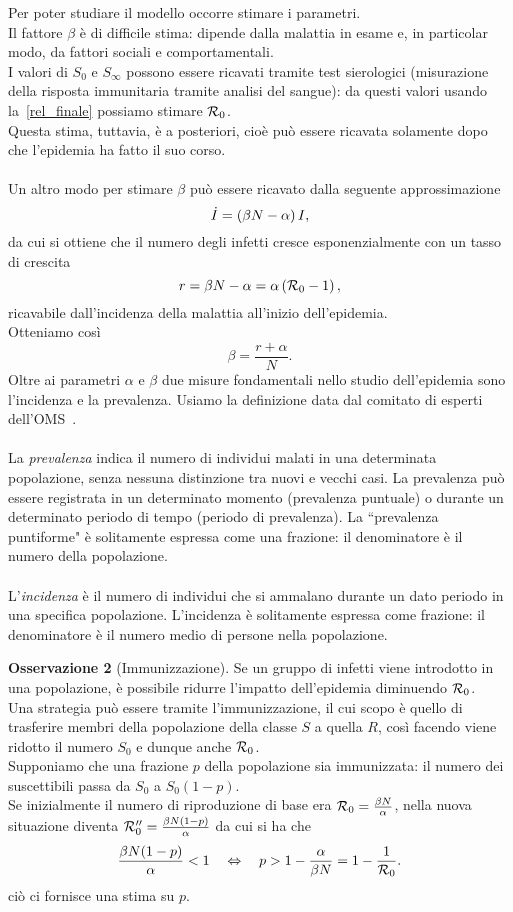 Per poter studiare il modello occorre stimare i parametri.\\ Il fattore $\beta$ \`e di difficile stima: dipende dalla malattia in esame e,  in particolar modo, da fattori sociali e comportamentali.\\
I valori di $S_0$ e $S_\infty$ possono essere ricavati tramite test sierologici (misurazione della risposta immunitaria tramite analisi del sangue): da questi valori usando la~\eqref{rel_finale} possiamo stimare $\mathcal R_0$.\\
Questa stima, tuttavia, \`e a posteriori, cio\`e pu\`o essere ricavata solamente dopo che l'epidemia ha fatto il suo corso.\\ \\
Un altro modo per stimare $\beta$ pu\`o essere ricavato dalla seguente approssimazione
$$ \dot I = \left(  \beta N -\alpha  \right) I,$$ 
da cui si ottiene che il numero degli infetti cresce esponenzialmente con un tasso di crescita 
$$ r =\beta N - \alpha = \alpha \left(  \mathcal R_0 -1 \right),$$
ricavabile dall'incidenza della malattia  all'inizio dell'epidemia.\\Otteniamo cos\`i 
$$ \beta = \frac{r + \alpha } {N}.$$
Oltre ai parametri $\alpha$ e $\beta$ due misure fondamentali nello studio dell'epidemia sono l'incidenza e la prevalenza. Usiamo la definizione data dal comitato di esperti dell'OMS~\cite{world1959expert}.\\ \\ 
La \textit{prevalenza} indica il numero di individui malati in una determinata popolazione, senza nessuna distinzione tra nuovi e vecchi casi. La prevalenza pu\`o essere registrata in un determinato momento (prevalenza puntuale) o durante un determinato periodo di tempo (periodo di prevalenza). La ``prevalenza puntiforme"  \`e solitamente espressa come una frazione: il denominatore \`e il numero della popolazione.\\ \\
L'\textit{incidenza} \`e il numero di  individui che si ammalano durante un dato periodo in una specifica popolazione. L'incidenza \`e solitamente espressa come frazione: il denominatore \`e il numero medio di persone nella popolazione.
\newpage

\textbf{Osservazione 2} (Immunizzazione).
Se un gruppo di infetti viene introdotto in una popolazione,  \`e possibile ridurre l'impatto dell'epidemia diminuendo $\mathcal R_0$.\\
Una strategia pu\`o essere tramite l'immunizzazione, il cui scopo \`e quello di trasferire membri della popolazione della classe $S$ a quella $R$, cos\`i facendo viene ridotto il numero $S_0$ e dunque anche $\mathcal R_0$.\\
Supponiamo che una frazione $p$ della popolazione sia  immunizzata: il numero dei suscettibili passa da $S_0$ a $S_0(1-p)$.\\
Se inizialmente il numero di riproduzione di base era $\mathcal R_0 = \frac{\beta N}{\alpha}$, nella nuova situazione diventa $\mathcal R_0''=\frac{\beta N(1-p)}{\alpha}$  da cui si ha che  
$$\frac{\beta N(1-p)}{\alpha}< 1\quad \Leftrightarrow \quad p> 1-\frac{\alpha}{\beta N} = 1 -\frac{1}{\mathcal R_0}.
$$
ci\`o ci fornisce una stima su $p$.

